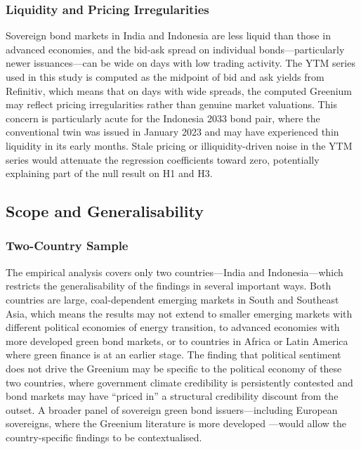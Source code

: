 \documentclass[12pt,a4paper]{article}
\begin{document}
\subsubsection{Liquidity and Pricing Irregularities}

Sovereign bond markets in India and Indonesia are less liquid than those in advanced economies, and the bid-ask spread on individual bonds---particularly newer issuances---can be wide on days with low trading activity. The YTM series used in this study is computed as the midpoint of bid and ask yields from Refinitiv, which means that on days with wide spreads, the computed Greenium may reflect pricing irregularities rather than genuine market valuations. This concern is particularly acute for the Indonesia 2033 bond pair, where the conventional twin was issued in January 2023 and may have experienced thin liquidity in its early months. Stale pricing or illiquidity-driven noise in the YTM series would attenuate the regression coefficients toward zero, potentially explaining part of the null result on H1 and H3.

\subsection{Scope and Generalisability}

\subsubsection{Two-Country Sample}

The empirical analysis covers only two countries---India and Indonesia---which restricts the generalisability of the findings in several important ways. Both countries are large, coal-dependent emerging markets in South and Southeast Asia, which means the results may not extend to smaller emerging markets with different political economies of energy transition, to advanced economies with more developed green bond markets, or to countries in Africa or Latin America where green finance is at an earlier stage. The finding that political sentiment does not drive the Greenium may be specific to the political economy of these two countries, where government climate credibility is persistently contested and bond markets may have ``priced in'' a structural credibility discount from the outset. A broader panel of sovereign green bond issuers---including European sovereigns, where the Greenium literature is more developed \citep{Flammer2021}---would allow the country-specific findings to be contextualised.
\end{document}
